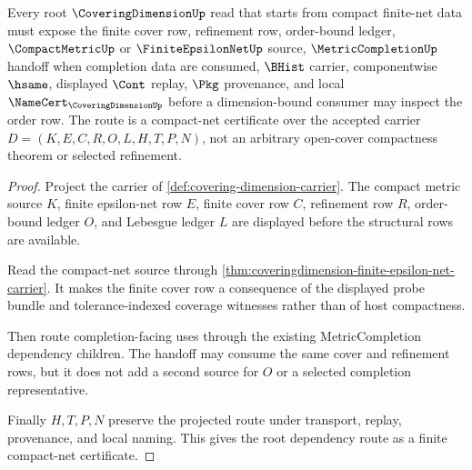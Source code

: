 \begin{theorem}
\label{thm:coveringdimension-compact-net-dependency-route}
Every root $\CoveringDimensionUp$ read that starts from compact finite-net data must expose the finite cover row, refinement row, order-bound ledger, $\CompactMetricUp$ or $\FiniteEpsilonNetUp$ source, $\MetricCompletionUp$ handoff when completion data are consumed, $\BHist$ carrier, componentwise $\hsame$, displayed $\Cont$ replay, $\Pkg$ provenance, and local $\NameCert_{\CoveringDimensionUp}$ before a dimension-bound consumer may inspect the order row. The route is a compact-net certificate over the accepted carrier $D=(K,E,C,R,O,L,H,T,P,N)$, not an arbitrary open-cover compactness theorem or selected refinement.
\end{theorem}
\begin{proof}
Project the carrier of \autoref{def:covering-dimension-carrier}. The compact metric source $K$, finite epsilon-net row $E$, finite cover row $C$, refinement row $R$, order-bound ledger $O$, and Lebesgue ledger $L$ are displayed before the structural rows are available.

Read the compact-net source through \autoref{thm:coveringdimension-finite-epsilon-net-carrier}. It makes the finite cover row a consequence of the displayed probe bundle and tolerance-indexed coverage witnesses rather than of host compactness.

Then route completion-facing uses through the existing MetricCompletion dependency children. The handoff may consume the same cover and refinement rows, but it does not add a second source for $O$ or a selected completion representative.

Finally $H,T,P,N$ preserve the projected route under transport, replay, provenance, and local naming. This gives the root dependency route as a finite compact-net certificate.
\end{proof}

